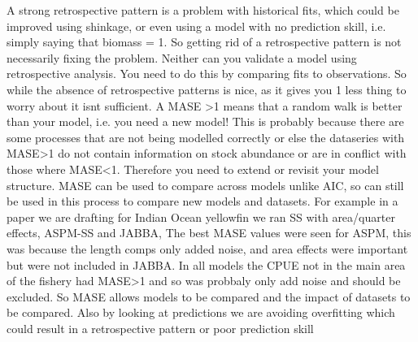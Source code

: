 A strong retrospective pattern is a problem with historical fits, which could be improved using shinkage, or even using a model with no prediction skill, i.e. simply saying that biomass = 1. So getting rid of a retrospective pattern is not necessarily fixing the problem. Neither can you validate a model using retrospective analysis. You need to do this by comparing fits to observations. So while the absence of retrospective patterns is nice, as it gives you 1 less thing to worry about it isnt sufficient.
 A MASE >1 means that a random walk is better than your model, i.e. you need a new model! This is probably because there are some processes that are not being modelled correctly or else the dataseries with MASE>1 do not contain information on stock abundance or are in conflict with those where MASE<1. Therefore you need to extend or revisit your model structure. MASE can be used to compare across models unlike AIC, so can still be used in this process to compare new models and datasets. For example in a paper we are drafting for Indian Ocean yellowfin we ran SS with area/quarter effects, ASPM-SS and JABBA, The best MASE values were seen for ASPM, this was because the length comps only added noise, and area effects were important but were not included in JABBA. In all  models the CPUE not in the main area of the fishery had MASE>1 and so was probbaly only add noise and should be excluded. So MASE allows models to be compared and the impact of datasets to be compared. Also by looking at predictions we are avoiding overfitting which could result in a retrospective pattern or poor prediction skill 
\